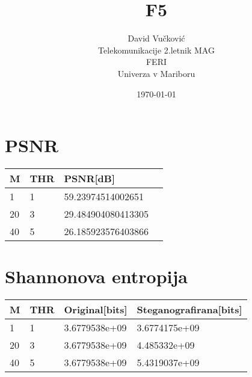 \documentclass[12pt,a4paper]{article}
\title{\huge{\textbf{F5}}}
\author{
        David Vučković \\
                Telekomunikacije 2.letnik MAG\\
        FERI\\
        Univerza v Mariboru}
\date{\today}
\begin{document}
\maketitle
\thispagestyle{empty}

\clearpage %


\thispagestyle{empty}

\clearpage %

\section{PSNR} %

\begin{table}[H]
    \begin{tabular}{llll}
    M     & THR & PSNR[dB] \\ \hline
    1  & 1               &  59.23974514002651               \\
    20 & 3               & 29.484904080413305                    \\
    40     & 5             & 26.185923576403866                       \\
    \end{tabular}
\end{table}

\section{Shannonova entropija}

\begin{table}[H]
    \begin{tabular}{llll}
    M     & THR & Original[bits] & Steganografirana[bits] \\ \hline
    1  & 1               &  3.6779538e+09     & 3.6774175e+09           \\
    20 & 3               & 3.6779538e+09         &   4.485332e+09         \\
    40     & 5             & 3.6779538e+09        &   5.4319037e+09            \\
    \end{tabular}
\end{table}
\end{document}
